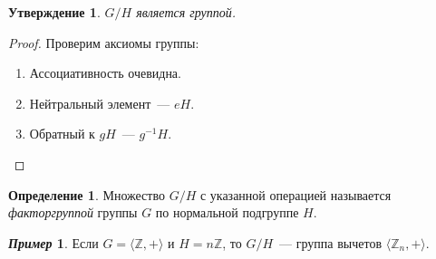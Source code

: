 \documentclass[a4paper, 14pt]{extarticle}
\newcommand{\integers}{\mathbb{Z}}
\theoremstyle{definition}
\newtheorem*{exmpl*}{\textit{Пример}}
\newtheorem{definition}{Определение}
\theoremstyle{plain}
\numberwithin{theorem}{section}
\numberwithin{definition}{section}
\newtheorem*{statement*}{Утверждение}
\numberwithin{statement}{section}
\numberwithin{lemma}{section}
\numberwithin{consequence}{section}
\begin{document}
	\newpage
	\begin{statement*}
		$G/H$ является группой.
	\end{statement*}
	\begin{proof}
		Проверим аксиомы группы:
		\begin{enumerate}
			\setlength\itemsep{0.1em}
			\item Ассоциативность очевидна.
			\item Нейтральный элемент~--- $eH.$
			\item Обратный к $gH$~--- $g^{-1}H.$ \qedhere 
		\end{enumerate}
	\end{proof}
	\begin{definition}
		Множество $G/H$ с указанной операцией называется \textit{факторгруппой} группы $G$ по нормальной подгруппе $H$.
	\end{definition}
	\begin{exmpl*}
		Если $G = \langle \integers, + \rangle$ и $H = n\integers$, то $G/H$~--- группа вычетов $\langle \integers_n, + \rangle.$
	\end{exmpl*}
	\newpage	
\end{document}

